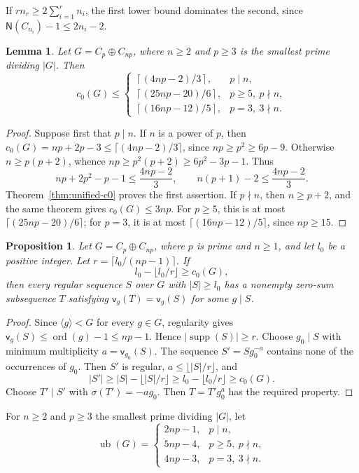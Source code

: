 \documentclass[10pt,reqno]{amsart}
\newtheorem{lem}[thm]{Lemma}
\newtheorem{prop}[thm]{Proposition}
\theoremstyle{definition}
\theoremstyle{remark}
\numberwithin{equation}{section}
\DeclareMathOperator{\ord}{ord}
\DeclareMathOperator{\supp}{supp}
\begin{document}
If $rn_r\ge2\sum_{i=1}^r n_i$, the first lower bound dominates the second,
since $\mathsf{N}(C_{n_i})-1\le2n_i-2$.

\begin{lem}\label{lem6.1}
Let $G=C_p\oplus C_{np}$, where $n\ge2$ and $p\ge3$ is the
smallest prime dividing $|G|$. Then
\[
c_0(G)\le
\begin{cases}
\left\lceil(4np-2)/3\right\rceil,&p\mid n,\\
\left\lceil(25np-20)/6\right\rceil,&p\ge5,\ p\nmid n,\\
\left\lceil(16np-12)/5\right\rceil,&p=3,\ 3\nmid n.
\end{cases}
\]
\end{lem}

\begin{proof}
Suppose first that $p\mid n$.
If $n$ is a power of $p$, then
$c_0(G)=np+2p-3\le\lceil(4np-2)/3\rceil$, since
$np\ge p^2\ge6p-9$.
Otherwise $n\ge p(p+2)$, whence
$np\ge p^2(p+2)\ge6p^2-3p-1$. Thus
\[
np+2p^2-p-1\le\frac{4np-2}{3},
\qquad
n(p+1)-2\le\frac{4np-2}{3}.
\]
Theorem~\ref{thm:unified-c0} proves the first assertion.
If $p\nmid n$, then $n\ge p+2$, and the same theorem gives
$c_0(G)\le3np$.
For $p\ge5$, this is at most $\lceil(25np-20)/6\rceil$;
for $p=3$, it is at most $\lceil(16np-12)/5\rceil$,
since $np\ge15$.
\end{proof}

\begin{prop}\label{prop:regular-N-reduction}
Let $G=C_p\oplus C_{np}$, where $p$ is prime and $n\ge1$, and let $l_0$ be a positive integer.
Let $r=\lceil l_0/(np-1)\rceil$. If
\[
l_0-\lfloor l_0/r\rfloor\ge c_0(G),
\]
then every regular sequence $S$ over $G$ with $|S|\ge l_0$
has a nonempty zero-sum subsequence $T$ satisfying
$\mathsf v_g(T)=\mathsf v_g(S)$ for some $g\mid S$.
\end{prop}

\begin{proof}
Since $\langle g\rangle<G$ for every $g\in G$,
regularity gives $\mathsf v_g(S)\le\ord(g)-1\le np-1$.
Hence $|\supp(S)|\ge r$.
Choose $g_0\mid S$ with minimum multiplicity
$a=\mathsf v_{g_0}(S)$. The sequence $S'=Sg_0^{-a}$
contains none of the occurrences of $g_0$.
Then $S'$ is regular, $a\le\lfloor |S|/r\rfloor$, and
\[
|S'|\ge |S|-\lfloor |S|/r\rfloor
\ge l_0-\lfloor l_0/r\rfloor\ge c_0(G).
\]
Choose $T'\mid S'$ with $\sigma(T')=-ag_0$.
Then $T=T'g_0^a$ has the required property.
\end{proof}

For $n\ge2$ and $p\ge3$ the smallest prime dividing $|G|$, let
\[
\operatorname{ub}(G)=\begin{cases}
2np-1,&p\mid n,\\
5np-4,&p\ge5,\ p\nmid n,\\
4np-3,&p=3,\ 3\nmid n.
\end{cases}
\]
\end{document}

